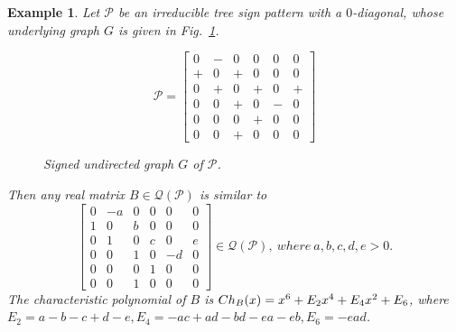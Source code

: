 \documentclass[10pt,a4paper]{amsart}
\newtheorem{eg}{Example}[section]
\numberwithin{equation}{section}
\def\Ch{{\rm Ch}}
\begin{document}
\begin{eg}
	Let $\mathcal{P}$ be an irreducible tree sign pattern with a $0$-diagonal, whose underlying graph $G$ is given in Fig.~\ref{X.1}.
	\begin{figure}[H]
		\centering
		\begin{minipage}{.45\textwidth}
			\vspace{-1cm}
			\[
			\mathcal{P}=\begin{bmatrix}
				0 & - & 0 & 0 & 0 & 0 \\
				+ & 0 & + & 0 & 0 & 0 \\
				0 & + & 0 & + & 0 & + \\
				0 & 0 & + & 0 & - & 0 \\
				0 & 0 & 0 & + & 0 & 0 \\
				0 & 0 & + & 0 & 0 & 0
			\end{bmatrix}
			\]
		\end{minipage}
		\hspace{0.05\textwidth}
		\begin{minipage}{.45\textwidth}
			\centering
			\tikzset{node distance=1cm}
			\caption{Signed undirected graph $G$ of $\mathcal{P}$.}
			\label{X.1}
		\end{minipage}
	\end{figure}
	
	Then any real matrix $B\in \mathcal{Q}(\mathcal{P})$ is similar to\\		
	$$
	\begin{bmatrix}
		0 & -a &  0&0  &0  & 0  \\
		1 & 0 & b  & 0&0 &0    \\
		0& 1 & 0  & c  & 0&e  \\
		0&0 & 1   & 0  & -d &0  \\
		0&0  &  0   & 1 & 0 & 0\\
		0&0  &  1 &  0& 0  & 0
	\end{bmatrix}\in \mathcal{Q}(\mathcal{P}),~ where~ a,b,c,d,e>0.$$
	The characteristic polynomial of $B$ is $\Ch_{B}(x)= x^6+E_2 x^4+E_4x^2+E_6$, where $E_2=a-b-c+d-e, E_4= -ac+ad-bd-ea-eb, E_6=-ead$.
	

\end{eg}
\end{document}
